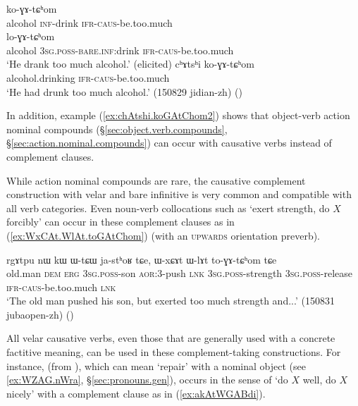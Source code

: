 \begin{exe}
\ex \label{ex:GAtChom}
\begin{xlist}
\ex \label{ex:kAtshi.koGAtChom}
 ko-ɣɤ-tɕʰom \\
alcohol \textsc{inf}-drink \textsc{ifr}-\textsc{caus}-be.too.much \\
\ex \label{ex:Wtshi.loGAtChom}
 lo-ɣɤ-tɕʰom \\
alcohol \textsc{3sg}.\textsc{poss}-\textsc{bare}.\textsc{inf}:drink \textsc{ifr}-\textsc{caus}-be.too.much \\
\glt `He drank too much alcohol.' (elicited)
\ex \label{ex:chAtshi.koGAtChom2}
\gll cʰɤtsʰi ko-ɣɤ-tɕʰom \\
alcohol.drinking \textsc{ifr}-\textsc{caus}-be.too.much \\
\glt `He had drunk too much alcohol.' (150829 jidian-zh)
()
\end{xlist}
\end{exe}

In addition, example (\ref{ex:chAtshi.koGAtChom2}) shows that object-verb action nominal compounds (§\ref{sec:object.verb.compounds}, §\ref{sec:action.nominal.compounds}) can occur with causative verbs instead of complement clauses.

While action nominal compounds are rare, the causative complement construction with velar and bare infinitive is very common and compatible with all verb categories. Even noun-verb collocations such as  `exert strength, do $X$ forcibly' can occur in these complement clauses as in (\ref{ex:WxCAt.WlAt.toGAtChom}) (with an  \textsc{upwards} orientation preverb).

\begin{exe}
\ex \label{ex:WxCAt.WlAt.toGAtChom}
\gll  rgɤtpu nɯ kɯ ɯ-tɕɯ ja-stʰoʁ tɕe, ɯ-xɕɤt ɯ-lɤt to-ɣɤ-tɕʰom tɕe \\
old.man \textsc{dem} \textsc{erg} \textsc{3sg}.\textsc{poss}-son \textsc{aor}:3\flobv{}-push \textsc{lnk} \textsc{3sg}.\textsc{poss}-strength \textsc{3sg}.\textsc{poss}-release \textsc{ifr}-\textsc{caus}-be.too.much \textsc{lnk} \\
\glt `The old man pushed his son, but exerted too much strength and...'   (150831 jubaopen-zh)
()
\end{exe}

All velar causative verbs, even those that are generally used with a concrete factitive meaning, can be used in these com\-ple\-ment-taking constructions. For instance,  (from ), which can mean `repair' with a nominal object (see \ref{ex:WZAG.nWra}, §\ref{sec:pronouns.gen}), occurs in the sense of `do $X$ well, do $X$ nicely' with a complement clause as in (\ref{ex:akAtWGABdi}).

